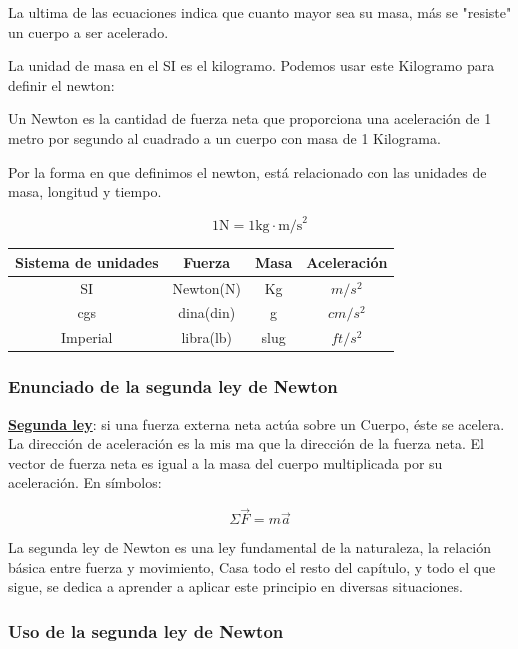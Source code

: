 \documentclass{article}
\newcommand{\newtitle}[1]{
    \color{titleColor}
    \subsubsection{\textbf{#1}}
    \color{black}
}
\newcommand{\bl}[1]{\textbf{#1}}
\newcommand{\definicion}[1]{%
    \vspace{0.5cm}
    \begin{definicionbox}
        #1
    \end{definicionbox}
    \vspace{0.5cm}
}
\begin{document}
    \par La ultima de las ecuaciones indica que cuanto mayor sea su masa, más se "resiste" un cuerpo a ser acelerado.
    \par La unidad de masa en el SI es el kilogramo. Podemos usar este Kilogramo para definir el newton:

    \definicion{
        \par Un Newton es la cantidad de fuerza neta que proporciona una aceleración de 1 metro por segundo al cuadrado a un cuerpo con masa de 1 Kilograma.
    }

    \par Por la forma en que definimos el newton, está relacionado con las unidades de masa, longitud y tiempo.

    \[ 1 \text{N} = 1 \text{kg} \cdot \text{m/s}^2 \]

    \begin{table}[H]
        \centering
        \begin{tabular}{|c|c|c|c|}
            \hline
            Sistema de unidades & Fuerza & Masa & Aceleración \\
            \hline
            SI & Newton(N) & Kg & $m/s^2$ \\
            \hline
            cgs & dina(din) & g & $cm/s^2$ \\
            \hline
            Imperial & libra(lb) & slug & $ft/s^2$ \\
            \hline
        \end{tabular}
    \end{table}

    \newtitle{Enunciado de la segunda ley de Newton}

    \definicion{
        \par \color{blue}\underline{\bl{Segunda ley}}\color{black}: si una fuerza externa neta actúa sobre un Cuerpo, éste se acelera. La dirección de aceleración es la mis ma que la dirección de la fuerza neta. El vector de fuerza neta es igual a la masa del cuerpo multiplicada por su aceleración. En símbolos: 

        \[\Sigma \vec{F} = m \vec{a}\]
    }

    \par La segunda ley de Newton es una ley fundamental de la naturaleza, la relación básica entre fuerza y movimiento, Casa todo el resto del capítulo, y todo el que sigue, se dedica a aprender a aplicar este principio en diversas situaciones.

    \newtitle{Uso de la segunda ley de Newton}
\end{document}
